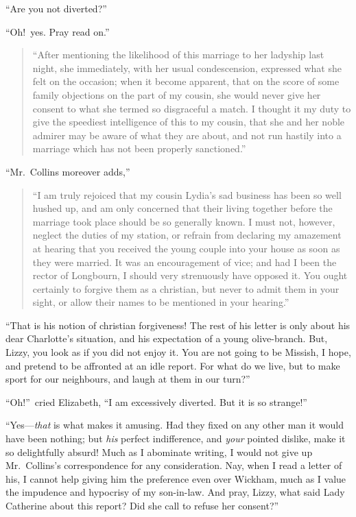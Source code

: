 \documentclass[12pt,english]{book}
\begin{document}
{}``Are you not diverted?''

{}``Oh!\ yes. Pray read on.''

\begin{quote}{}``After mentioning the likelihood of this marriage
to her ladyship last night, she immediately, with her usual condescension,
expressed what she felt on the occasion; when it become apparent,
that on the score of some family objections on the part of my cousin,
she would never give her consent to what she termed so disgraceful
a match. I thought it my duty to give the speediest intelligence of
this to my cousin, that she and her noble admirer may be aware of
what they are about, and not run hastily into a marriage which has
not been properly sanctioned.''\end{quote} {}``Mr.\ Collins moreover
adds,'' \begin{quote}{}``I am truly rejoiced that my cousin Lydia's
sad business has been so well hushed up, and am only concerned that
their living together before the marriage took place should be so
generally known. I must not, however, neglect the duties of my station,
or refrain from declaring my amazement at hearing that you received
the young couple into your house as soon as they were married. It
was an encouragement of vice; and had I been the rector of Longbourn,
I should very strenuously have opposed it. You ought certainly to
forgive them as a christian, but never to admit them in your sight,
or allow their names to be mentioned in your hearing.''\end{quote}
{}``That is his notion of christian forgiveness! The rest of his
letter is only about his dear Charlotte's situation, and his expectation
of a young olive-branch. But, Lizzy, you look as if you did not enjoy
it. You are not going to be Missish, I hope, and pretend to be affronted
at an idle report. For what do we live, but to make sport for our
neighbours, and laugh at them in our turn?''

{}``Oh!''\ cried Elizabeth, {}``I am excessively diverted. But
it is so strange!''

{}``Yes\mbox{---}\textit{that} is what makes it amusing. Had they
fixed on any other man it would have been nothing; but \textit{his}
perfect indifference, and \textit{your} pointed dislike, make it so
delightfully absurd! Much as I abominate writing, I would not give
up Mr.\ Collins's correspondence for any consideration. Nay, when
I read a letter of his, I cannot help giving him the preference even
over Wickham, much as I value the impudence and hypocrisy of my son-in-law.
And pray, Lizzy, what said Lady Catherine about this report? Did she
call to refuse her consent?''
\end{document}
